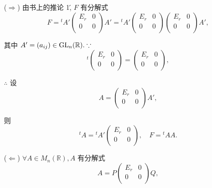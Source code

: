 \documentclass{ctexart}
\begin{document}
\begin{solution}
    ($\Rightarrow$) 由书上的推论 1\', $F$ 有分解式
    \[F={}^tA'\begin{pmatrix}
        E_r & 0 \\
        0 & 0 \\
    \end{pmatrix}A'={}^tA'\begin{pmatrix}
        E_r & 0 \\
        0 & 0 \\
    \end{pmatrix}\begin{pmatrix}
        E_r & 0 \\
        0 & 0 \\
    \end{pmatrix}A',\]

    其中 $A'=(a_{ij})\in\operatorname{GL} _n(\mathbb{R}).\because$
    \[{}^t\begin{pmatrix}
        E_r & 0 \\
        0 & 0 \\
    \end{pmatrix}=\begin{pmatrix}
        E_r & 0 \\
        0 & 0 \\
    \end{pmatrix},\]

    $\therefore$ 设
    \[A=\begin{pmatrix}
        E_r & 0 \\
        0 & 0 \\
    \end{pmatrix}A',\]

    则
    \[{}^tA={}^tA'\begin{pmatrix}
        E_r & 0 \\
        0 & 0 \\
    \end{pmatrix},\quad F={}^tAA.\]

    ($\Leftarrow$) $\forall A\in M_n(\mathbb{R}),A$ 有分解式
    \[A=P\begin{pmatrix}
        E_r & 0 \\
        0 & 0 \\
    \end{pmatrix}Q,\]


\end{solution}
\end{document}
